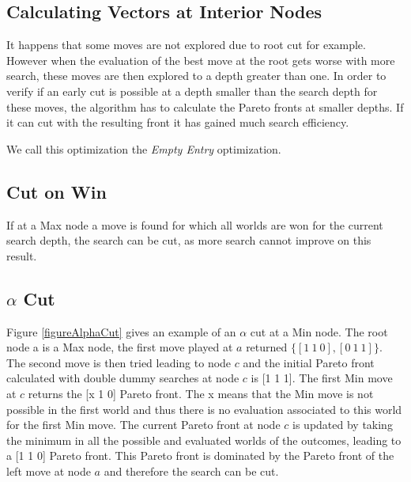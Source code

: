 \documentclass[letterpaper]{article} %
\begin{document}

\subsection{Calculating Vectors at Interior Nodes}

It happens that some moves are not explored due to root cut for example. However when the evaluation of the best move at the root gets worse with more search, these moves are then explored to a depth greater than one. In order to verify if an early cut is possible at a depth smaller than the search depth for these moves, the algorithm has to calculate the Pareto fronts at smaller depths. If it can cut with the resulting front it has gained much search efficiency.

We call this optimization the \textit{Empty Entry} optimization.

\subsection{Cut on Win}

If at a Max node a move is found for which all worlds are won for the current search depth, the search can be cut, as more search cannot improve on this result.


\subsection{$\alpha$ Cut}

Figure \ref{figureAlphaCut} gives an example of an $\alpha$ cut at a Min node. The root node a is a Max node, the first move played at $a$ returned $\{[1~1~0],[0~1~1]\}$. The second move is then tried leading to node $c$ and the initial Pareto front calculated with double dummy searches at node $c$ is [1 1 1]. The first Min move at $c$ returns the [x 1 0] Pareto front. The x means that the Min move is not possible in the first world and thus there is no evaluation associated to this world for the first Min move. The current Pareto front at node $c$ is
updated by taking the minimum in all the possible and evaluated worlds of the outcomes, leading to a [1 1 0] Pareto front. This Pareto front is dominated by the Pareto front of the left move at node $a$ and therefore the search can be cut.
\end{document}
